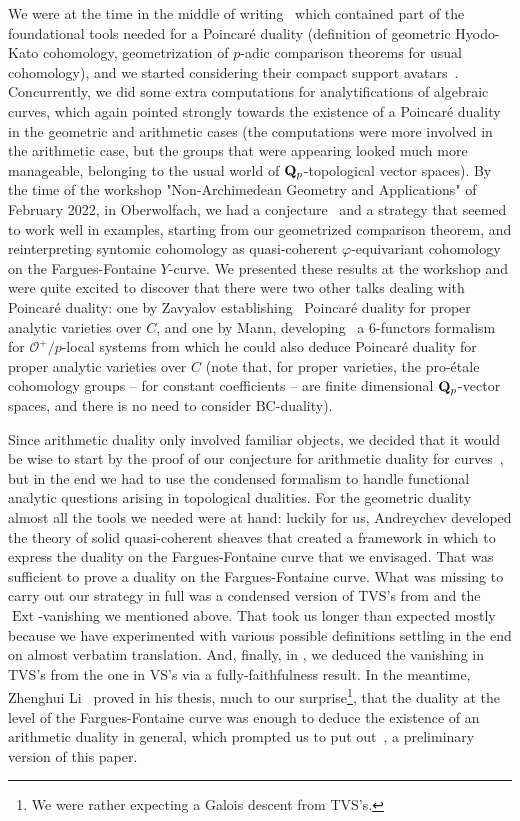 \documentclass[10pt,reqno]{amsart}
\let\cal\mathcal
\theoremstyle{definition}
\theoremstyle{remark}
\newcommand{\Ext}{\operatorname{Ext} }
\numberwithin{equation}{section}
\def\O{{\cal O}}
\def\Q{{\bf Q}} \def\Z{{\bf Z}}
\def\O{{\cal O}}
\numberwithin{equation}{section}
\begin{document}
We were at the time in the middle of writing~\cite{CN4,CN5} which contained part
of the foundational tools needed for a Poincar\'e duality 
(definition of geometric Hyodo-Kato cohomology, geometrization 
of $p$-adic comparison theorems for usual cohomology), and
we started considering their compact support avatars~\cite{AGN}. 
Concurrently, we did some extra computations for analytifications of
algebraic curves, which again pointed strongly towards the existence of a Poincar\'e duality
in the geometric and arithmetic cases (the computations were more involved in the arithmetic case,
but the groups that were appearing looked much more manageable, belonging to the usual
world of $\Q_p$-topological vector spaces).
By the time of the workshop "Non-Archimedean Geometry and Applications" of February 2022, in Oberwolfach, we had a conjecture~\cite{COB} and a strategy
that seemed to work well in examples, starting from our geometrized comparison theorem, and reinterpreting
syntomic cohomology as quasi-coherent $\varphi$-equivariant cohomology on the Fargues-Fontaine $Y$-curve.
We presented these results at the workshop and were quite excited to discover that there were
 two other talks dealing with Poincar\'e
duality: one by Zavyalov establishing~\cite{Zav} 
Poincar\'e duality for proper analytic varieties over $C$, and
one by Mann, developing~\cite{Mann} a 6-functors formalism for $\O^+/p$-local systems from which he
could also deduce Poincar\'e duality for proper analytic varieties over $C$ (note that, for
proper varieties, the pro-\'etale cohomology groups -- for constant coefficients --
are finite dimensional $\Q_p$-vector spaces, and there
is no need to consider $\mathrm{BC}$-duality). 

Since arithmetic duality only involved familiar objects, we decided that it would be wise to start
by the proof of our conjecture for arithmetic duality for curves~\cite{CGN}, but in the end we had to use
the condensed formalism to handle functional analytic questions arising in topological dualities.
 For the geometric duality almost all the tools we needed were at hand: luckily for us, Andreychev \cite{And21} developed the theory of solid quasi-coherent sheaves that created a framework in which to express the duality on the Fargues-Fontaine curve that we envisaged.
That was sufficient to prove a duality on the Fargues-Fontaine curve.
 What was missing to carry out our strategy in full was a condensed version of {\rm TVS}'s from \cite{CN5} 
and the $\Ext$-vanishing we mentioned above.
 That took us longer than expected mostly because we have experimented with various possible definitions settling in the end on almost verbatim translation.
 And, finally, in \cite{TVS}, we deduced the vanishing in {\rm TVS}'s from the one in {\rm VS}'s via a fully-faithfulness result. 
In the meantime, Zhenghui Li~\cite{ZL} proved in his thesis, much to our surprise\footnote{We were rather expecting a Galois descent from {\rm TVS}'s.}, that 
the duality at the level of the Fargues-Fontaine curve was enough to deduce the existence
of an arithmetic duality in general, which prompted us to put out~\cite{CGN2}, a preliminary version of this paper.
\end{document}
